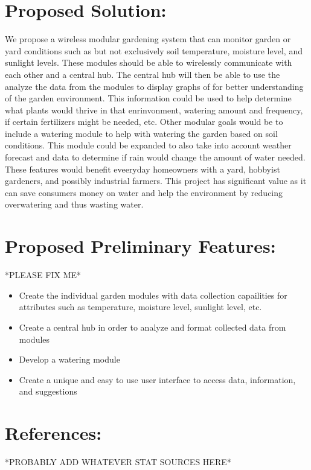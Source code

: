 \documentclass[]{article}
\begin{document}
\section*{Proposed Solution:}
	We propose a wireless modular gardening system that can monitor garden or yard conditions such as but not exclusively soil temperature, moisture level, and sunlight levels. These modules should be able to wirelessly communicate with each other and a central hub. The central hub will then be able to use the analyze the data from the modules to display graphs of for better understanding of the garden environment. This information could be used to help determine what plants would thrive in that enrinvonment, watering amount and frequency, if certain fertilizers might be needed, etc. Other modular goals would be to include a watering module to help with watering the garden based on soil conditions. This module could be expanded to also take into account weather forecast and data to determine if rain would change the amount of water needed. These features would benefit eveeryday homeowners with a yard, hobbyist gardeners, and possibly industrial farmers. This project has significant value as it can save consumers money on water and help the environment by reducing overwatering and thus wasting water. 

\section*{Proposed Preliminary Features:}
*PLEASE FIX ME*
\begin{itemize}
	\item Create the individual garden modules with data collection capailities for attributes such as temperature, moisture level, sunlight level, etc. 
	\item Create a central hub in order to analyze and format collected data from modules
	\item Develop a watering module
	\item Create a unique and easy to use user interface to access data, information, and suggestions
\end{itemize}

\section*{References:}
*PROBABLY ADD WHATEVER STAT SOURCES HERE*
\end{document}
